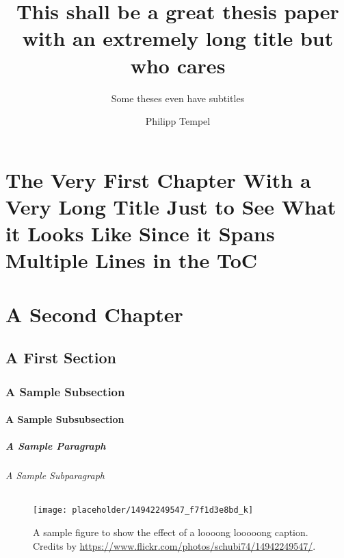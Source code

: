 \documentclass[%
    thesis=ma, %
    language=american, %
    paper=a4,%
    online,
    final,
]{isw}
\title{This shall be a great thesis paper with an extremely long title but who cares}
\subtitle{Some theses even have subtitles}
\author{Philipp Tempel}
\begin{document}
    \maketitle
    
    \begin{otherlanguage}{ngerman}\maketitle \end{otherlanguage}
    
    \tableofcontents
    
    \listoffigures
    
    \listoftables
    
    \listoftodos
    
    \chapter[The Short Title of the Chapter Showing Up in the TOC and the Page Headers]{The Very First Chapter With a Very Long Title Just to See What it Looks Like Since it Spans Multiple Lines in the ToC}
    
    \chapter{A Second Chapter}
    
    \section{A First Section}
    
    \subsection{A Sample Subsection}
    
    \subsubsection{A Sample Subsubsection}
    
    \paragraph{A Sample Paragraph}
    
    \subparagraph{A Sample Subparagraph}
    
    \begin{figure}
        \centering
        \texttt{[image: placeholder/14942249547\_f7f1d3e8bd\_k]}
        \caption{A sample figure to show the effect of a loooong looooong caption. Credits by \url{https://www.flickr.com/photos/schubi74/14942249547/}.}
        \label{fig:sample-figure}
    \end{figure}
    
\end{document}
